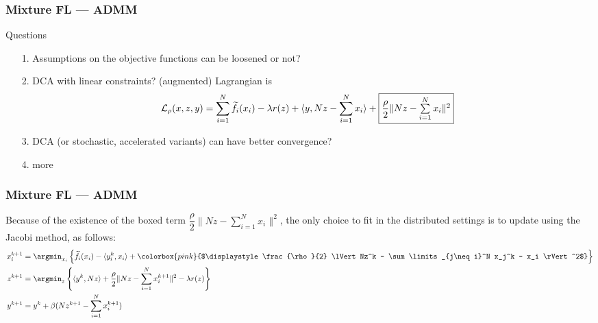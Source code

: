 \begin{frame}
\frametitle{Mixture FL --- ADMM}

\begin{block}{Questions}
\begin{itemize}
    \item[1.] Assumptions on the objective functions can be loosened or not?
    \item[2.] DCA with linear constraints? (augmented) Lagrangian is
    {\scriptsize
    $$\mathcal{L}_{\rho}(x,z,y) = \sum\limits_{i=1}^N \widetilde{f}_i(x_i) - \lambda r(z) + \langle y, Nz - \sum\limits_{i=1}^N x_i \rangle + \framebox{$\dfrac{\rho}{2} \lVert Nz - \sum\limits_{i=1}^N x_i \rVert^2$} $$
    }
    \item[3.] DCA (or stochastic, accelerated variants) can have better convergence?
    \item[4.] more
\end{itemize}
\end{block}

\end{frame}


\begin{frame}
\frametitle{Mixture FL --- ADMM}

Because of the existence of the boxed term $\dfrac{\rho}{2} \lVert Nz - \sum\limits_{i=1}^N x_i \rVert^2$, the only choice to fit in the distributed settings is to update using the Jacobi method, as follows:
{\footnotesize
\begin{align*}
    x_i^{k+1} & = \argmin_{x_i} \left\{ \widetilde{f}_i(x_i) - \langle y_i^k, x_i \rangle + \colorbox{pink}{$\displaystyle \frac{\rho}{2} \lVert Nz^k - \sum\limits_{j\neq i}^N x_j^k - x_i \rVert^2$} \right\} \\
    z^{k+1} & = \argmin_{z} \left\{ \langle y^k, Nz \rangle + \frac{\rho}{2} \lVert Nz - \sum\limits_{i=1}^N x_i^{k+1} \rVert^2 - \lambda r(z) \right\} \\
    y^{k+1} & = y^k + \beta (Nz^{k+1} - \sum\limits_{i=1}^N x_i^{k+1})
\end{align*}
}

\end{frame}


